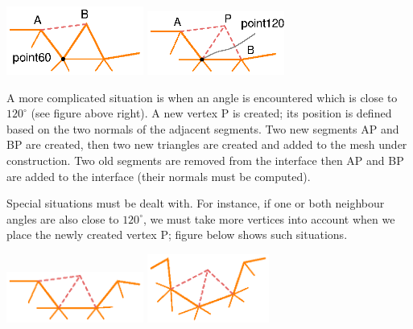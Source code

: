 {{ 
  \centerline{\includegraphics[width=45mm]{fill-angle-60.eps}
  \hskip5mm \includegraphics[width=45mm]{fill-angle-120.eps}} }

A more complicated situation is when an angle is encountered which is close to $ 120^\circ $
(see figure above right).
A new vertex {\codett P} is created; its position is defined based on the two normals
of the adjacent segments.
Two new segments {\codett AP} and {\codett BP} are created,
then two new triangles are created and added to the mesh under construction.
Two old segments are removed from the interface then {\codett AP} and {\codett BP} are added
to the interface (their normals must be computed).

Special situations must be dealt with.
For instance, if one or both neighbour angles are also close to $ 120^\circ $,
we must take more vertices into account when we place the newly created vertex {\codett P};
figure below shows such situations.

  \centerline{\includegraphics[width=45mm]{fill-angle-120-a.eps}
  \hskip5mm \includegraphics[width=40mm]{fill-angle-120-b.eps}}

}

